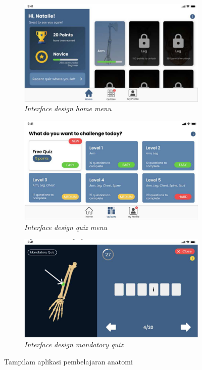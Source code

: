 \begin{figure}[htbp]
	\centering
	\begin{subfigure}[b]{0.4\textwidth}
		\centering
	  \includegraphics[width=\linewidth]{contents/chapter-2/images/Deta-a1.png}
	  \caption{\textit{Interface design home menu}}
	  \label{fig:sub-deta-a1}
	\end{subfigure}
	\begin{subfigure}[b]{0.4\textwidth}
	\centering
	  \includegraphics[width=\linewidth]{contents/chapter-2/images/Deta-a2.png}
	  \caption{\textit{Interface design quiz menu }}
	  \label{fig:sub-deta-a2}
	\end{subfigure}
	\hfill
	\begin{subfigure}[b]{0.4\textwidth}
		\centering
		\includegraphics[width=\linewidth]{contents/chapter-2/images/Deta-a3.png}
		\caption{\textit{Interface design mandatory quiz}}
		\label{fig:sub-deta-a3}
	\end{subfigure}  
	\caption{Tampilam aplikasi pembelajaran anatomi}
	\label{fig:interface pembelajaran anatomi}
  \end{figure}
